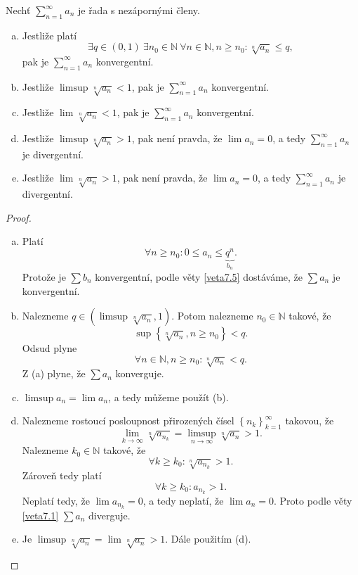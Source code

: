 \begin{veta} \label{veta7.7}
Nechť $\sum_{n=1}^{\infty} a_n$ je řada s nezápornými členy.
\begin{enumerate}[(a)]
	\item Jestliže platí
\[
\exists q \in (0,1)\ \exists n_0 \in \mathbb{N}\ \forall n \in \mathbb{N}, n \ge n_0 :
\sqrt[n]{a_n} \le q,
\]
pak je $\sum_{n=1}^{\infty} a_n$ konvergentní.

\item  Jestliže $\limsup \sqrt[n]{a_n} < 1$, pak je
$\sum_{n=1}^{\infty} a_n$ konvergentní.

\item  Jestliže $\lim \sqrt[n]{a_n} < 1$, pak je
$\sum_{n=1}^{\infty} a_n$ konvergentní.

\item  Jestliže $\limsup \sqrt[n]{a_n} > 1$, pak není pravda, že $\lim a_n = 0$,
a tedy $\sum_{n=1}^{\infty} a_n$ je divergentní.

\item Jestliže $\lim \sqrt[n]{a_n} > 1$, pak není pravda, že $\lim a_n = 0$,
a tedy $\sum_{n=1}^{\infty} a_n$ je divergentní.
\end{enumerate}
\end{veta}

\begin{proof}\,
\begin{enumerate}[(a)]
	\item Platí
	$$
	    \forall n \geq n_0: 0 \leq a_n \leq \underbrace{q^n}_{b_n}.
	$$
	Protože je $\sum b_n$ konvergentní, podle věty \ref{veta7.5} dostáváme, že
	$\sum a_n$ je konvergentní.
	\item Nalezneme $q\in (\limsup \sqrt[n]{a_n}, 1)$. Potom nalezneme
	$n_0\in \mathbb N $ takové, že
	$$
	    \sup \left \{ \sqrt[n]{a_n}, n \geq n_0 \right \} < q.
	$$
	Odsud plyne
	$$
	    \forall n \in \mathbb N , n \geq n_0: \sqrt[n]{a_n} < q.
	$$
	Z (a) plyne, že $\sum a_n$ konverguje.
	\item $\limsup a_n = \lim a_n$, a tedy můžeme použít (b).
	\item Nalezneme rostoucí posloupnost přirozených čísel $\left \{ n_k \right \}_{k=1}^\infty $ takovou, že
	$$
 \lim_{k \to \infty} \sqrt[n]{a_{n_k}} = \limsup_{n\to \infty} \sqrt[n]{a_n} > 1.
	$$
	Nalezneme $k_0 \in \mathbb N $ takové, že
	$$
	    \forall k \geq k_0: \sqrt[n]{a_{n_k}} > 1.
	$$
	Zároveň tedy platí
	$$
	    \forall k \geq k_0: a_{n_k} > 1.
	$$
	Neplatí tedy, že $\lim a_{n_k} =0$, a tedy neplatí, že $\lim a_n = 0$. Proto
	podle věty \ref{veta7.1} $\sum a_n$ diverguje.
	\item Je $\limsup \sqrt[n]{a_n} = \lim \sqrt[n]{a_n} > 1$. Dále použitím (d).\qedhere
\end{enumerate}
\end{proof}

